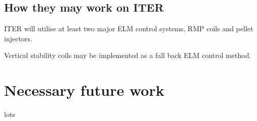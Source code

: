 \documentclass[aps,prl,reprint]{revtex4-1}
\begin{document}
\subsection{How they may work on ITER}\label{ssec:onITER}
ITER will utilise at least two major ELM control systems, RMP coils and pellet injectors.\cite{Loarte2010}

Vertical stability coils may be implemented as a fall back ELM control method.\cite{Loarte2014a}

\section{Necessary future work}\label{sec:Future}
lots

  
\end{document}
